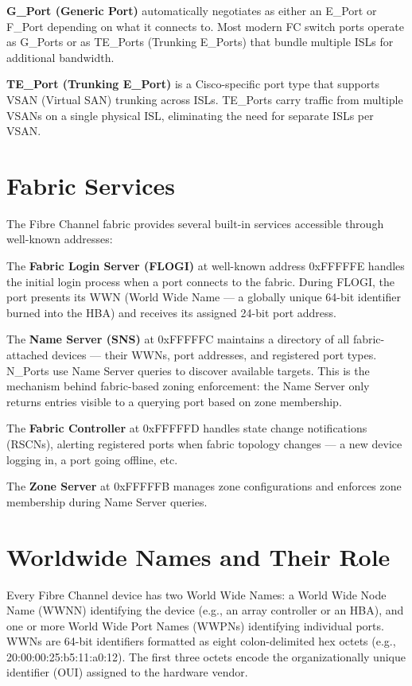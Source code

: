 \textbf{G\_Port (Generic Port)} automatically negotiates as either an E\_Port or F\_Port depending on what it connects to. Most modern FC switch ports operate as G\_Ports or as TE\_Ports (Trunking E\_Ports) that bundle multiple ISLs for additional bandwidth.

\textbf{TE\_Port (Trunking E\_Port)} is a Cisco-specific port type that supports VSAN (Virtual SAN) trunking across ISLs. TE\_Ports carry traffic from multiple VSANs on a single physical ISL, eliminating the need for separate ISLs per VSAN.

\section{Fabric Services}
The Fibre Channel fabric provides several built-in services accessible through well-known addresses:

The \textbf{Fabric Login Server (FLOGI)} at well-known address 0xFFFFFE handles the initial login process when a port connects to the fabric. During FLOGI, the port presents its WWN (World Wide Name --- a globally unique 64-bit identifier burned into the HBA) and receives its assigned 24-bit port address.

The \textbf{Name Server (SNS)} at 0xFFFFFC maintains a directory of all fabric-attached devices --- their WWNs, port addresses, and registered port types. N\_Ports use Name Server queries to discover available targets. This is the mechanism behind fabric-based zoning enforcement: the Name Server only returns entries visible to a querying port based on zone membership.

The \textbf{Fabric Controller} at 0xFFFFFD handles state change notifications (RSCNs), alerting registered ports when fabric topology changes --- a new device logging in, a port going offline, etc.

The \textbf{Zone Server} at 0xFFFFFB manages zone configurations and enforces zone membership during Name Server queries.

\section{Worldwide Names and Their Role}
Every Fibre Channel device has two World Wide Names: a World Wide Node Name (WWNN) identifying the device (e.g., an array controller or an HBA), and one or more World Wide Port Names (WWPNs) identifying individual ports. WWNs are 64-bit identifiers formatted as eight colon-delimited hex octets (e.g., 20:00:00:25:b5:11:a0:12). The first three octets encode the organizationally unique identifier (OUI) assigned to the hardware vendor.


